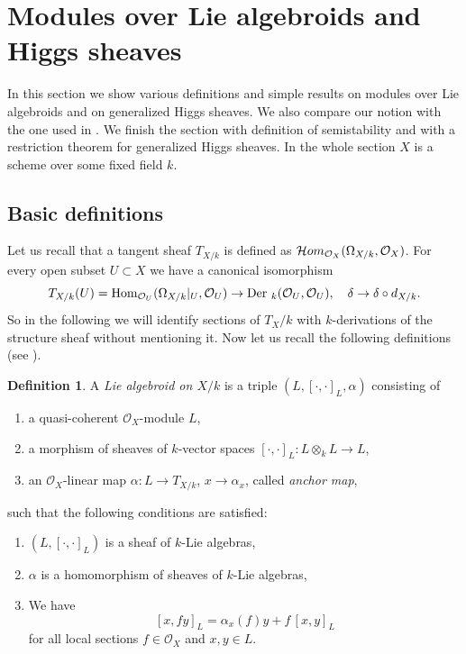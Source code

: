 \documentclass[12pt]{article}
\theoremstyle{plain}
\theoremstyle{definition}
\newtheorem{Definition}[Thm]{Definition}
\theoremstyle{remark}
\newcommand{\cO}{{\mathcal O}}
\newcommand{\Hom}{{\mathop{{\rm Hom}}}}
\newcommand{\cHom}{{\mathop{{\cal H}om}}}
\begin{document}
\section{Modules over Lie algebroids and Higgs sheaves}\label{Section:Higgs-sheaves}

In this section we show various definitions and simple results on modules over Lie algebroids and on generalized Higgs sheaves. We also compare our notion with the one used in \cite{GKPT2}. We finish the section with definition of semistability and with a restriction theorem for generalized Higgs sheaves. In the whole section $X$ is a scheme over some fixed field $k$.

\subsection{Basic definitions}

Let us recall that a tangent sheaf $T_{X/k}$ is defined as $\cHom_{\cO_X} (\Omega _{X/k}, \cO_X)$. 
For every open subset $U\subset X$ we have a canonical isomorphism 
$$T_{X/k} (U)= \Hom _{\cO_U} (\Omega _{X/k}|_U, \cO_U)\to \mathop{\rm Der}\, _k(\cO_U, \cO_U), \quad \delta \to \delta \circ d_{X/k}.$$
So in the following we will identify sections of $T_X/k$ with $k$-derivations of the structure sheaf
without mentioning it. Now let us  recall the following definitions (see \cite[Sections 2 and 3]{La2}).

\begin{Definition}
	A \emph{Lie algebroid on $X/k$} is a triple $(L, [\cdot,
	\cdot ]_L, \alpha )$ consisting of 
\begin{enumerate}
	\item a quasi-coherent $\cO_X$-module $L$,
	\item a morphism of sheaves of $k$-vector spaces $ [\cdot,
	\cdot ]_L: L\otimes _kL\to L$,
	\item an $\cO_X$-linear map $\alpha: L\to
	T_{X/k}$, $x\to \alpha_x$, called \emph{anchor map},
\end{enumerate}	
	such that the following conditions are satisfied:
	\begin{enumerate}
		\item 	$(L, [\cdot, \cdot ]_L)$ is a sheaf of $k$-Lie algebras,
		\item $\alpha$ is a homomorphism  of sheaves of $k$-Lie algebras,
		\item We have 
		$$[x,fy]_L=\alpha _x (f)y+f\,[x,y]_L$$
	for all local sections $f\in \cO _X$ and $x,y\in L$.	
	\end{enumerate}
\end{Definition}
\end{document}
